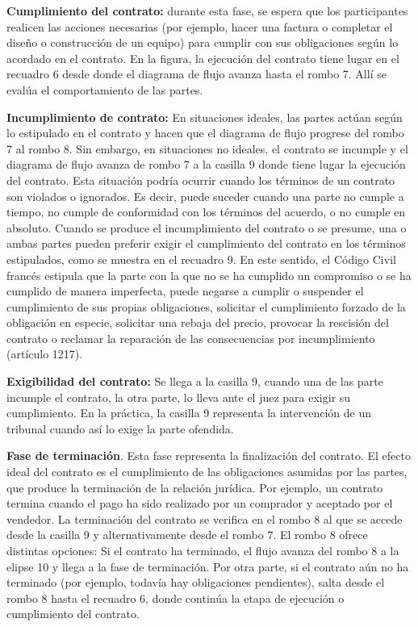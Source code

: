 \documentclass[12pt]{report} %
\begin{document}
\begin{itemize}
\textbf{Cumplimiento del contrato:} durante esta fase, se espera que los participantes realicen las acciones necesarias (por ejemplo, hacer una factura o completar el diseño o construcción de un equipo) para cumplir con sus obligaciones según lo acordado en el contrato. En la figura, la ejecución del contrato tiene lugar en el recuadro 6 desde donde el diagrama de flujo avanza hasta el rombo 7. Allí se evalúa el comportamiento de las partes.


\textbf{Incumplimiento de contrato:} En situaciones ideales, las partes actúan según lo estipulado en el contrato y hacen que el diagrama de flujo progrese del rombo 7 al rombo 8. Sin embargo, en situaciones no ideales, el contrato se incumple y el diagrama de flujo avanza de rombo 7 a la casilla 9 donde tiene lugar la ejecución del contrato. Esta situación podría ocurrir cuando los términos de un contrato son violados o ignorados. Es decir, puede suceder cuando una parte no cumple a tiempo, no cumple de conformidad con los términos del acuerdo, o no cumple en absoluto. Cuando se produce el incumplimiento del contrato o se presume, una o ambas partes pueden preferir exigir el cumplimiento del contrato en los términos estipulados, como se muestra en el recuadro 9. En este sentido, el Código Civil francés estipula que la parte con la que no se ha cumplido un compromiso o se ha cumplido de manera imperfecta, puede negarse a cumplir o suspender el cumplimiento de sus propias obligaciones, solicitar el cumplimiento forzado  de la obligación en especie, solicitar una rebaja del precio, provocar la rescisión del contrato o reclamar la reparación de las consecuencias por incumplimiento (artículo 1217).


\textbf{Exigibilidad del contrato:} Se llega a la casilla 9, cuando una de las parte incumple el contrato, la otra parte, lo lleva ante el juez para exigir su cumplimiento. En la práctica, la casilla 9 representa la intervención de un tribunal cuando así lo exige la parte ofendida.


\textbf{Fase de terminación}. Esta fase representa la finalización del contrato. El efecto ideal del contrato es el cumplimiento de las obligaciones asumidas por las partes, que produce la terminación de la relación jurídica. Por ejemplo, un contrato termina cuando el pago ha sido realizado por un comprador y aceptado por el vendedor. La terminación del contrato se verifica en el rombo 8 al que se accede desde la casilla 9 y alternativamente desde el rombo 7. El rombo 8 ofrece distintas opciones: Si el contrato ha terminado, el flujo avanza del rombo 8 a la elipse 10 y llega a la fase de terminación. Por otra parte, si el contrato aún no ha terminado (por ejemplo, todavía hay obligaciones pendientes), salta desde el rombo 8 hasta el recuadro 6, donde continúa la etapa de ejecución o cumplimiento del contrato.


\end{itemize}
\end{document}
